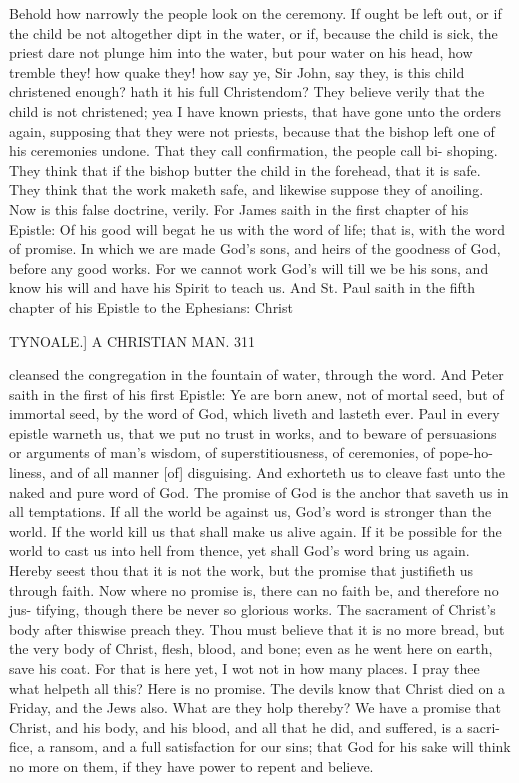 \documentclass{custom}
\begin{document}
{Behold how narrowly the people look on the ceremony. 
If ought be left out, or if the child be not altogether dipt 
in the water, or if, because the child is sick, the priest 
dare not plunge him into the water, but pour water on his 
head, how tremble they! how quake they! how say ye, 
Sir John, say they, is this child christened enough? hath it 
his full Christendom? They believe verily that the child 
is not christened; yea I have known priests, that have 
gone unto the orders again, supposing that they were not 
priests, because that the bishop left one of his ceremonies 
undone. That they call confirmation, the people call bi- 
shoping. They think that if the bishop butter the child 
in the forehead, that it is safe. They think that the work 
maketh safe, and likewise suppose they of anoiling. Now 
is this false doctrine, verily. For James saith in the first 
chapter of his Epistle: Of his good will begat he us with 
the word of life; that is, with the word of promise. In 
which we are made God's sons, and heirs of the goodness 
of God, before any good works. For we cannot work 
God's will till we be his sons, and know his will and 
have his Spirit to teach us. And St. Paul saith in the 
fifth chapter of his Epistle to the Ephesians: Christ 


TYNOALE.]
A CHRISTIAN MAN.
311

cleansed the congregation in the fountain of water, through 
the word. And Peter saith in the first of his first Epistle: 
Ye are born anew, not of mortal seed, but of immortal 
seed, by the word of God, which liveth and lasteth ever. 
Paul in every epistle warneth us, that we put no trust in 
works, and to beware of persuasions or arguments of man's 
wisdom, of superstitiousness, of ceremonies, of pope-ho- 
liness, and of all manner [of] disguising. And exhorteth 
us to cleave fast unto the naked and pure word of God. 
The promise of God is the anchor that saveth us in all 
temptations. If all the world be against us, God's word 
is stronger than the world. If the world kill us that shall 
make us alive again. If it be possible for the world to 
cast us into hell from thence, yet shall God's word bring 
us again. Hereby seest thou that it is not the work, but 
the promise that justifieth us through faith. Now where 
no promise is, there can no faith be, and therefore no jus- 
tifying, though there be never so glorious works. The 
sacrament of Christ's body after thiswise preach they. 
Thou must believe that it is no more bread, but the very 
body of Christ, flesh, blood, and bone; even as he went 
here on earth, save his coat. For that is here yet, I wot 
not in how many places. I pray thee what helpeth all 
this? Here is no promise. The devils know that Christ 
died on a Friday, and the Jews also. What are they holp 
thereby? We have a promise that Christ, and his body, 
and his blood, and all that he did, and suffered, is a sacri- 
fice, a ransom, and a full satisfaction for our sins; that 
God for his sake will think no more on them, if they have 
power to repent and believe. 

}
\end{document}
